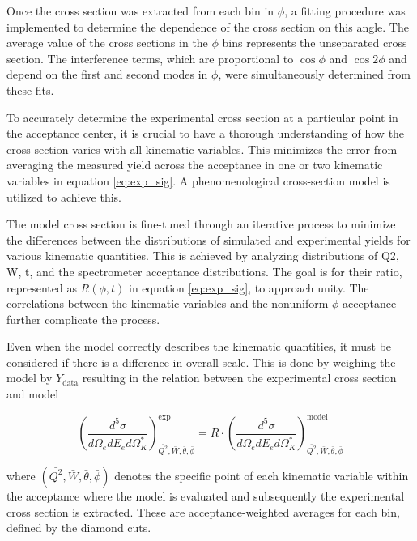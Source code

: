 \documentclass[
]{report}
\begin{document}
Once the cross section was extracted from each bin in \(\phi\), a
fitting procedure was implemented to determine the dependence of the
cross section on this angle. The average value of the cross sections in
the \(\phi\) bins represents the unseparated cross section. The
interference terms, which are proportional to \(\cos{\phi}\) and
\(\cos{2\phi}\) and depend on the first and second modes in \(\phi\),
were simultaneously determined from these fits.

\label{Chapter-5-1}

To accurately determine the experimental cross section at a particular
point in the acceptance center, it is crucial to have a thorough
understanding of how the cross section varies with all kinematic
variables. This minimizes the error from averaging the measured yield
across the acceptance in one or two kinematic variables in equation
\ref{eq:exp_sig}. A phenomenological cross-section model is utilized to
achieve this.

The model cross section is fine-tuned through an iterative process to
minimize the differences between the distributions of simulated and
experimental yields for various kinematic quantities. This is achieved
by analyzing distributions of Q2, W, t, and the spectrometer acceptance
distributions. The goal is for their ratio, represented as \(R(\phi,t)\)
in equation \ref{eq:exp_sig}, to approach unity. The correlations
between the kinematic variables and the nonuniform \(\phi\) acceptance
further complicate the process.

Even when the model correctly describes the kinematic quantities, it
must be considered if there is a difference in overall scale. This is
done by weighing the model by \(Y_{\mathrm{data}}\) resulting in the
relation between the experimental cross section and model

\begin{equation} 
(\frac{d^5\sigma}{d\Omega_{e}dE_{e}d\Omega_{K}^*})_{\bar{Q^2},\bar{W},\bar{\theta},\bar{\phi}}^{\mathrm{exp}}=R\cdot(\frac{d^5\sigma}{d\Omega_{e}dE_{e}d\Omega_{K}^*})_{\bar{Q^2},\bar{W},\bar{\theta},\bar{\phi}}^{\mathrm{model}}
  \label{eq:exp_sig_model} 
\end{equation}

\noindent where \((\bar{Q^2},\bar{W},\bar{\theta},\bar{\phi})\) denotes
the specific point of each kinematic variable within the acceptance
where the model is evaluated and subsequently the experimental cross
section is extracted. These are acceptance-weighted averages for each
bin, defined by the diamond cuts.
\end{document}
